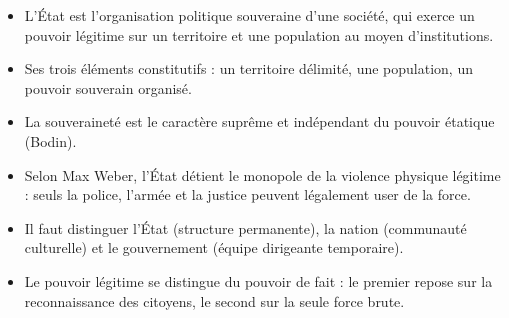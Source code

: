 \documentclass[11pt]{article}
\begin{document}
\begin{aretenir}
\begin{itemize}
\item L'État est l'organisation politique souveraine d'une société, qui exerce un pouvoir légitime sur un territoire et une population au moyen d'institutions.
\item Ses trois éléments constitutifs : un territoire délimité, une population, un pouvoir souverain organisé.
\item La souveraineté est le caractère suprême et indépendant du pouvoir étatique (Bodin).
\item Selon Max Weber, l'État détient le monopole de la violence physique légitime : seuls la police, l'armée et la justice peuvent légalement user de la force.
\item Il faut distinguer l'État (structure permanente), la nation (communauté culturelle) et le gouvernement (équipe dirigeante temporaire).
\item Le pouvoir légitime se distingue du pouvoir de fait : le premier repose sur la reconnaissance des citoyens, le second sur la seule force brute.
\end{itemize}
\end{aretenir}
\end{document}
